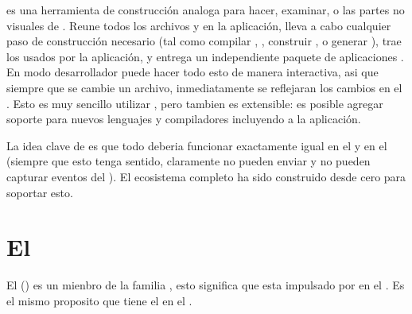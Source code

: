 \begin{itemize}
\commandlinemeteor es una herramienta de construcción analoga para hacer, examinar, o las partes no visuales de \visualstudio. Reune todos los archivos y \assets en la aplicación, lleva a cabo cualquier paso de construcción necesario (tal como compilar \coffeescript, \minifying \css, construir \modules \npm, o generar \sourcemaps), trae los \packages usados por la aplicación, y entrega un independiente paquete de aplicaciones \readytorun. En modo desarrollador puede hacer todo esto de manera interactiva, asi que siempre que se cambie un archivo, inmediatamente se reflejaran los cambios en el \browser. Esto es muy sencillo utilizar \outofthebox, pero tambien es extensible: es posible agregar soporte para nuevos lenguajes y compiladores incluyendo \build \plugin \packages a la aplicación.

\end{itemize}

La idea clave de \meteor \package \system es que todo deberia funcionar exactamente igual en el \browser y en el \server (siempre que esto tenga sentido, claramente \browsers no pueden enviar \emails y \servers no pueden capturar eventos del \mouse). El ecosistema completo ha sido construido desde cero para soportar esto.

\section{El \stack \meteor}


El \stack \meteor() es un mienbro de la familia \meanstack, esto significa que esta impulsado por \nodejs en el \serverside. Es el mismo proposito que tiene el \webserver \apache en el \stack \lamp.



